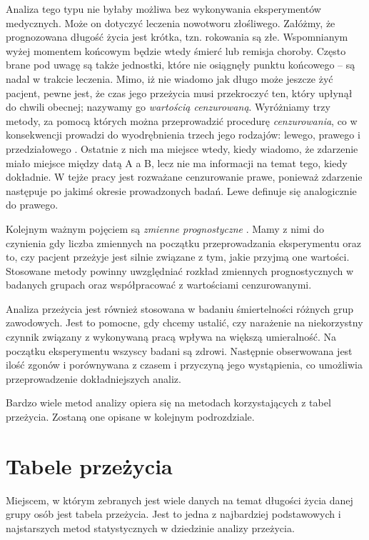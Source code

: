 \documentclass[licencjacka]{pwr_wmat_praca_dyplomowa}
\theoremstyle{plain}
\numberwithin{theorem}{chapter}
\theoremstyle{definition}
\numberwithin{theorem}{chapter}
\begin{document}
Analiza tego typu nie byłaby możliwa bez wykonywania eksperymentów medycznych. Może on dotyczyć leczenia nowotworu złośliwego. Załóżmy, że prognozowana długość życia jest krótka, tzn. rokowania są złe. Wspomnianym wyżej momentem końcowym będzie wtedy śmierć lub remisja choroby. Często brane pod uwagę są także jednostki, które nie osiągnęły punktu końcowego  -- są nadal w trakcie leczenia. Mimo, iż nie wiadomo jak długo może jeszcze żyć pacjent, pewne jest, że czas jego przeżycia musi przekroczyć ten, który upłynął do chwili obecnej; nazywamy go \textit{wartością cenzurowaną}. Wyróżniamy trzy metody, za pomocą których można przeprowadzić procedurę \textit{cenzurowania}, co w konsekwencji prowadzi do wyodrębnienia trzech jego rodzajów: lewego, prawego i przedziałowego \cite{itsa}. Ostatnie z nich ma miejsce wtedy, kiedy wiadomo, że zdarzenie miało miejsce między datą A a B, lecz nie ma informacji na temat tego, kiedy dokładnie. W tejże pracy jest rozważane cenzurowanie prawe, ponieważ zdarzenie następuje po jakimś okresie prowadzonych badań. Lewe definuje się analogicznie do prawego.



Kolejnym ważnym pojęciem są \textit{zmienne prognostyczne} \cite{smimr}. Mamy z nimi do czynienia gdy liczba zmiennych na początku przeprowadzania eksperymentu oraz to, czy pacjent przeżyje jest silnie związane z tym, jakie przyjmą one wartości. Stosowane metody powinny uwzględniać rozkład zmiennych prognostycznych w badanych grupach oraz współpracować z wartościami cenzurowanymi.  


Analiza przeżycia jest również stosowana w badaniu śmiertelności różnych grup zawodowych. Jest to pomocne, gdy chcemy ustalić, czy narażenie na niekorzystny czynnik związany z wykonywaną pracą wpływa na większą umieralność. Na początku eksperymentu wszyscy badani są zdrowi. Następnie obserwowana jest ilość zgonów i porównywana z czasem i przyczyną jego wystąpienia, co umożliwia przeprowadzenie dokładniejszych analiz. 

Bardzo wiele metod analizy opiera się na metodach korzystających z tabel przeżycia. Zostaną one opisane w kolejnym podrozdziale.

\section{Tabele przeżycia}





Miejscem, w którym zebranych jest wiele danych na temat długości życia danej grupy osób jest tabela przeżycia. Jest to jedna z najbardziej podstawowych i najstarszych metod statystycznych w dziedzinie analizy przeżycia.
\end{document}
